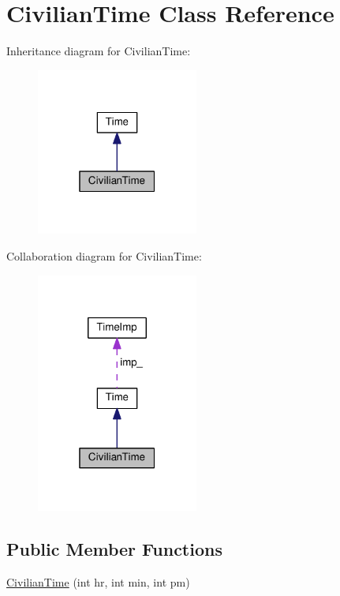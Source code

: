 \hypertarget{classCivilianTime}{}\section{Civilian\+Time Class Reference}
\label{classCivilianTime}


Inheritance diagram for Civilian\+Time\+:
\nopagebreak
\begin{figure}[H]
\begin{center}
\leavevmode
\includegraphics[width=151pt]{classCivilianTime__inherit__graph}
\end{center}
\end{figure}


Collaboration diagram for Civilian\+Time\+:
\nopagebreak
\begin{figure}[H]
\begin{center}
\leavevmode
\includegraphics[width=151pt]{classCivilianTime__coll__graph}
\end{center}
\end{figure}
\subsection*{Public Member Functions}
\begin{DoxyCompactItemize}
\item 
\hyperlink{classCivilianTime_abd07d3fcd877a5bfe28037075b867393}{Civilian\+Time} (int hr, int min, int pm)
\end{DoxyCompactItemize}

